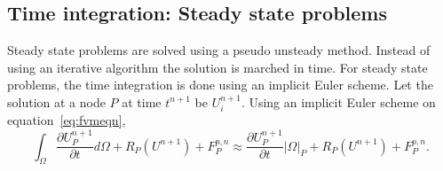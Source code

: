 \subsection{Time integration: Steady state problems}\label{sssec:timediscr}
Steady state problems are solved using a pseudo unsteady method. Instead of using an iterative algorithm the solution is marched in time. For steady state problems, the time integration is done using an implicit Euler scheme. Let the solution at a node $P$ at time $t^{n+1}$ be $U_i^{n+1}$. Using an implicit Euler scheme on equation~\ref{eq:fvmeqn},
\begin{equation}
\int_{\Omega}\frac{\partial U^{n+1}_P}{\partial t}d\Omega +R_P(U^{n+1}) + F^{p,n}_P \approx 
\frac{\partial U^{n+1}_P}{\partial t} |\Omega|_P + R_P(U^{n+1}) + F^{p,n}_P.
\end{equation}

